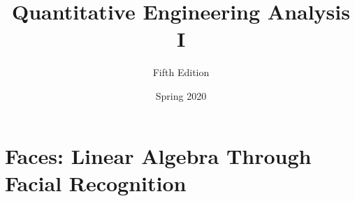 \documentclass[oneside,10pt]{memoir}
\title{Quantitative Engineering Analysis I}
\author{Fifth Edition}
\date{Spring 2020}
\begin{document}

\maketitle

\newpage %

\tableofcontents %


\part{Faces: Linear Algebra Through Facial Recognition}





















\end{document}
